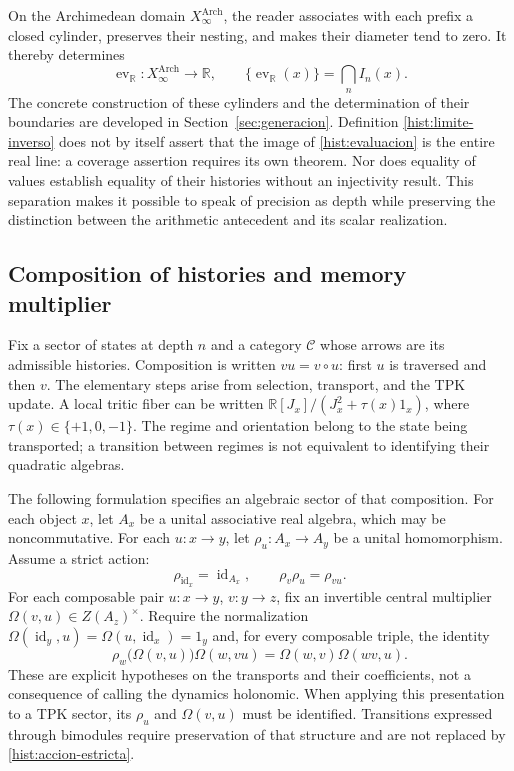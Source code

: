 On the Archimedean domain \(X_\infty^{\mathrm{Arch}}\), the reader associates
with each prefix a closed cylinder, preserves their nesting, and makes
their diameter tend to zero. It thereby determines
\begin{equation}
 \operatorname{ev}_{\mathbb R}:X_\infty^{\mathrm{Arch}}\longrightarrow
 \mathbb R,\qquad
 \{\operatorname{ev}_{\mathbb R}(x)\}=\bigcap_n I_n(x).
 \label{hist:evaluacion}
\end{equation}
The concrete construction of these cylinders and the determination of their boundaries
are developed in Section~\ref{sec:generacion}. Definition
\eqref{hist:limite-inverso} does not by itself assert that the image of
\eqref{hist:evaluacion} is the entire real line: a coverage assertion
requires its own theorem. Nor does equality of values establish equality of
their histories without an injectivity result. This separation
makes it possible to speak of precision as depth while preserving the distinction
between the arithmetic antecedent and its scalar realization.

\subsection{Composition of histories and memory multiplier}
\label{hist:algebra}

Fix a sector of states at depth \(n\) and a category
\(\mathcal C\) whose arrows are its admissible histories. Composition
is written \(vu=v\circ u\): first \(u\) is traversed and then \(v\).
The elementary steps arise from selection, transport, and the
TPK update. A local tritic fiber can be written
\(\mathbb R[J_x]/(J_x^2+\tau(x)1_x)\), where
\(\tau(x)\in\{+1,0,-1\}\). The regime and orientation belong to the
state being transported; a transition between regimes is not equivalent to
identifying their quadratic algebras.

The following formulation specifies an algebraic sector of that composition.
For each object \(x\), let \(A_x\) be a unital associative real algebra,
which may be noncommutative. For each \(u:x\to y\), let
\(\rho_u:A_x\to A_y\) be a unital homomorphism. Assume a strict action:
\begin{equation}
 \rho_{\operatorname{id}_x}=\operatorname{id}_{A_x},\qquad
 \rho_v\rho_u=\rho_{vu}.
 \label{hist:accion-estricta}
\end{equation}
For each composable pair \(u:x\to y\), \(v:y\to z\), fix an
invertible central multiplier
\(\Omega(v,u)\in Z(A_z)^\times\). Require the normalization
\(\Omega(\operatorname{id}_y,u)=\Omega(u,\operatorname{id}_x)=1_y\)
and, for every composable triple, the identity
\begin{equation}
 \rho_w\bigl(\Omega(v,u)\bigr)\Omega(w,vu)
   =\Omega(w,v)\Omega(wv,u).
 \label{hist:cociclo}
\end{equation}
These are explicit hypotheses on the transports and their coefficients, not a
consequence of calling the dynamics holonomic. When applying this presentation
to a TPK sector, its \(\rho_u\) and \(\Omega(v,u)\) must be identified.
Transitions expressed through bimodules require preservation of that
structure and are not replaced by \eqref{hist:accion-estricta}.

